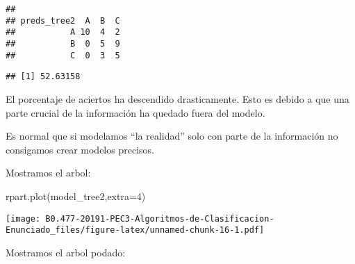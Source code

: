 \documentclass[]{article}
\newenvironment{Shaded}{\begin{snugshade}}{\end{snugshade}}
\newcommand{\KeywordTok}[1]{\textcolor[rgb]{0.94,0.87,0.69}{#1}}
\newcommand{\DataTypeTok}[1]{\textcolor[rgb]{0.87,0.87,0.75}{#1}}
\newcommand{\DecValTok}[1]{\textcolor[rgb]{0.86,0.86,0.80}{#1}}
\newcommand{\FloatTok}[1]{\textcolor[rgb]{0.75,0.75,0.82}{#1}}
\newcommand{\StringTok}[1]{\textcolor[rgb]{0.80,0.58,0.58}{#1}}
\newcommand{\CommentTok}[1]{\textcolor[rgb]{0.50,0.62,0.50}{#1}}
\newcommand{\OperatorTok}[1]{\textcolor[rgb]{0.94,0.94,0.82}{#1}}
\newcommand{\NormalTok}[1]{\textcolor[rgb]{0.80,0.80,0.80}{#1}}
\begin{document}
\begin{verbatim}
##            
## preds_tree2  A  B  C
##           A 10  4  2
##           B  0  5  9
##           C  0  3  5
\end{verbatim}

\begin{Shaded}
\end{Shaded}

\begin{verbatim}
## [1] 52.63158
\end{verbatim}

El porcentaje de aciertos ha descendido drasticamente. Esto es debido a
que una parte crucial de la información ha quedado fuera del modelo.

Es normal que si modelamos ``la realidad'' solo con parte de la
información no consigamos crear modelos precisos.

Mostramos el arbol:

\begin{Shaded}
\begin{Highlighting}[]
\KeywordTok{rpart.plot}\NormalTok{(model_tree2,}\DataTypeTok{extra=}\DecValTok{4}\NormalTok{)}
\end{Highlighting}
\end{Shaded}

\texttt{[image: B0.477-20191-PEC3-Algoritmos-de-Clasificacion-Enunciado\_files/figure-latex/unnamed-chunk-16-1.pdf]}

Mostramos el arbol podado:

\begin{Shaded}
\end{Shaded}
\end{document}
